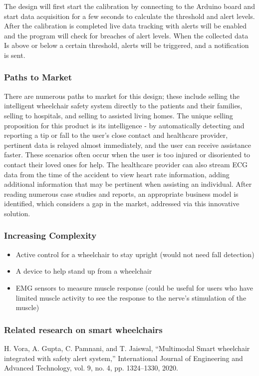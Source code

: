 \documentclass[11pt]{article}
\begin{document}
The design will first start the calibration by connecting to the Arduino board and start data acquisition for a few seconds to calculate the threshold and alert levels. After the calibration is completed live data tracking with alerts will be enabled and the program will check for breaches of alert levels. When the collected data Is above or below a certain threshold, alerts will be triggered, and a notification is sent.

\subsubsection{Paths to Market}
\label{sec:orga43fa28}
There are numerous paths to market for this design; these include selling the intelligent wheelchair safety system directly to the patients and their families, selling to hospitals, and selling to assisted living homes. The unique selling proposition for this product is its intelligence - by automatically detecting and reporting a tip or fall to the user’s close contact and healthcare provider, pertinent data is relayed almost immediately, and the user can receive assistance faster. These scenarios often occur when the user is too injured or disoriented to contact their loved ones for help. The healthcare provider can also stream ECG data from the time of the accident to view heart rate information, adding additional information that may be pertinent when assisting an individual. After reading numerous case studies and reports, an appropriate business model is identified, which considers a gap in the market, addressed via this innovative solution.

\subsubsection{Increasing Complexity}
\label{sec:org8c7ccad}
\begin{itemize}
\item Active control for a wheelchair to stay upright (would not need fall detection)
\item A device to help stand up from a wheelchair
\item EMG sensors to measure muscle response (could be useful for users who have limited muscle activity to see the response to the nerve’s stimulation of the muscle)
\end{itemize}


\subsubsection{Related research on smart wheelchairs}
\label{sec:org17e32d8}
H. Vora, A. Gupta, C. Pamnani, and T. Jaiswal, “Multimodal Smart wheelchair integrated with safety alert system,” International Journal of Engineering and Advanced Technology, vol. 9, no. 4, pp. 1324–1330, 2020.
\end{document}
